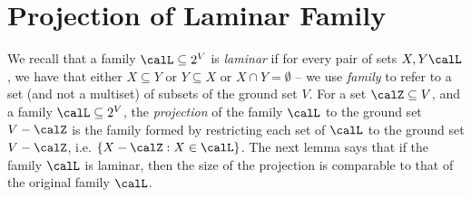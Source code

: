 \section{Projection of Laminar Family}\label{appendix:sec:uncrossing-properties:projection-of-laminar-families}
We recall that 
a family $\calL \subseteq 2^V$ is \emph{laminar} if for every pair of sets $X, Y\calL$, we have that either $X\subseteq Y$ or $Y\subseteq X$ or $X\cap Y=\emptyset$  --  we use \emph{family} to refer to a set (and not a multiset) of subsets of the ground set $V$. 
For a set $\calZ\subseteq V$, and a family $\calL \subseteq 2^V$,
the \emph{projection} of the family $\calL$ to the ground set $V - \calZ$ is the family formed by restricting each set of $\calL$ to the ground set $V - \calZ$, i.e. $\{X - \calZ : X \in \calL\}$.
The next lemma says that if the family $\calL$ is laminar, then the size of the projection %
is comparable to that of the original family $\calL$.


